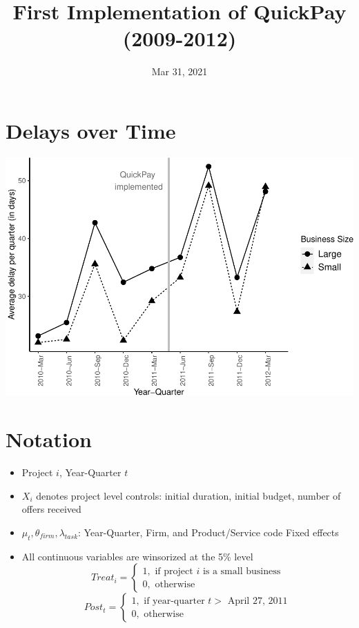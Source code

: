 \documentclass[
]{article}
\title{First Implementation of QuickPay (2009-2012)}
\author{}
\date{\vspace{-2.5em}Mar 31, 2021}
\providecommand{\tightlist}{%
  \setlength{\itemsep}{0pt}\setlength{\parskip}{0pt}}
\begin{document}
\maketitle

\hypertarget{delays-over-time}{%
\section{Delays over Time}\label{delays-over-time}}

\includegraphics{qp_first_implementation_files/figure-latex/plot-1.pdf}

\hypertarget{notation}{%
\section{Notation}\label{notation}}

\begin{itemize}
\tightlist
\item
  Project \(i\), Year-Quarter \(t\)
\item
  \(X_i\) denotes project level controls: initial duration, initial
  budget, number of offers received
\item
  \(\mu_t,\theta_{firm},\lambda_{task}\): Year-Quarter, Firm, and
  Product/Service code Fixed effects
\item
  All continuous variables are winsorized at the 5\% level
  \[ Treat_i = \begin{cases} 1, \text{ if project } i \text{ is a small business}\\
  0, \text{ otherwise} \end{cases}\]
  \[ Post_t = \begin{cases} 1, \text{ if year-quarter } t > \text{ April 27, 2011}\\
  0, \text{ otherwise} \end{cases}\]
\end{itemize}
\end{document}

